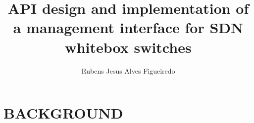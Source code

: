 \documentclass[11pt,a4paper,oneside,openright]{report}
\begin{document}
\nocite{*}


\title{API design and implementation of a management interface for SDN whitebox switches}

\author{Rubens Jesus Alves Figueiredo}

\thesisdate{\today}








\begin{Prolog}
    \tableofcontents
    \cleardoublepage
    \listoffigures
    \cleardoublepage
    \listoftables
\end{Prolog}

\StartBody

 
\part {BACKGROUND}



%
%
%
%
%
\end{document}
